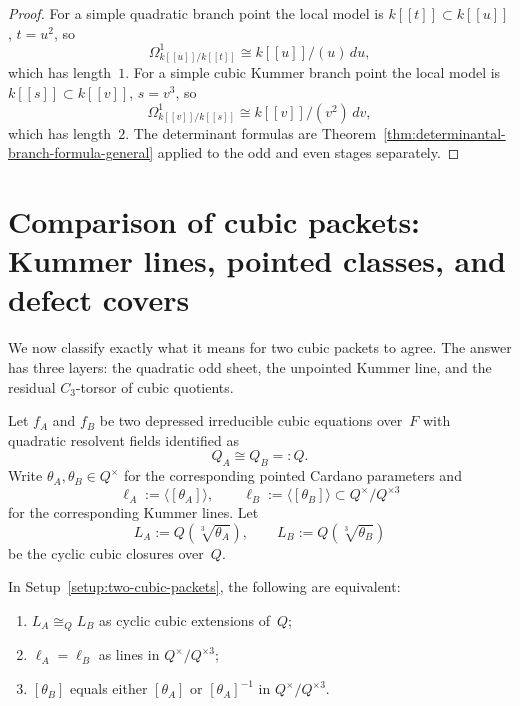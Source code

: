 \begin{proof}
For a simple quadratic branch point the local model is
$k[[t]]\subset k[[u]]$, $t=u^2$, so
\[
\Omega^1_{k[[u]]/k[[t]]}\cong k[[u]]/(u)\,du,
\]
which has length~$1$.  For a simple cubic Kummer branch point the local model
is $k[[s]]\subset k[[v]]$, $s=v^3$, so
\[
\Omega^1_{k[[v]]/k[[s]]}\cong k[[v]]/(v^2)\,dv,
\]
which has length~$2$.  The determinant formulas are
Theorem~\ref{thm:determinantal-branch-formula-general} applied to the odd and
even stages separately.
\end{proof}

\section{Comparison of cubic packets: Kummer lines, pointed classes, and defect covers}
\label{sec:comparison-cubic-packets}

We now classify exactly what it means for two cubic packets to agree.  The
answer has three layers: the quadratic odd sheet, the unpointed Kummer line, and
the residual $C_3$-torsor of cubic quotients.

\begin{setup}
\label{setup:two-cubic-packets}
Let $f_A$ and $f_B$ be two depressed irreducible cubic equations over~$F$ with
quadratic resolvent fields identified as
\[
Q_A\cong Q_B=:Q.
\]
Write $\theta_A,\theta_B\in Q^{\times}$ for the corresponding pointed Cardano
parameters and
\[
\ell_A:=\langle[\theta_A]\rangle,
\qquad
\ell_B:=\langle[\theta_B]\rangle
\subset Q^{\times}/Q^{\times 3}
\]
for the corresponding Kummer lines.  Let
\[
L_A:=Q(\sqrt[3]{\theta_A}),
\qquad
L_B:=Q(\sqrt[3]{\theta_B})
\]
be the cyclic cubic closures over~$Q$.
\end{setup}

\begin{theorem}
\label{thm:unpointed-kummer-equality}
In Setup~\ref{setup:two-cubic-packets}, the following are equivalent:
\begin{enumerate}[label=\textup{(\roman*)}]
\item $L_A\cong_Q L_B$ as cyclic cubic extensions of~$Q$;
\item $\ell_A=\ell_B$ as lines in $Q^{\times}/Q^{\times 3}$;
\item $[\theta_B]$ equals either $[\theta_A]$ or $[\theta_A]^{-1}$ in
$Q^{\times}/Q^{\times 3}$.
\end{enumerate}
\end{theorem}

